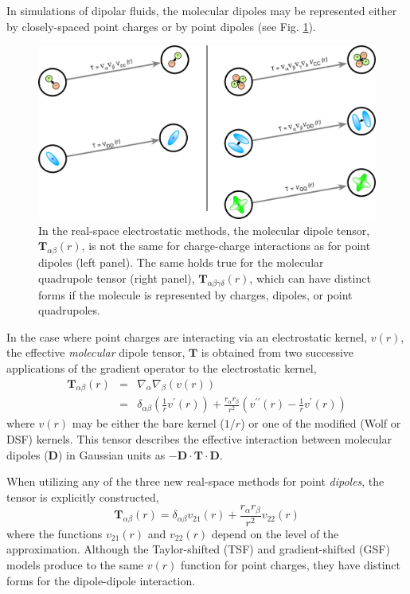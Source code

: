 In simulations of dipolar fluids, the molecular dipoles may be
represented either by closely-spaced point charges or by 
point dipoles (see Fig. \ref{fig:tensor}).
\begin{figure}
\includegraphics[width=\linewidth]{Tensors}
\caption{In the real-space electrostatic methods, the molecular dipole
  tensor, $\mathbf{T}_{\alpha\beta}(r)$, is not the same for
  charge-charge interactions as for point dipoles (left panel). The
  same holds true for the molecular quadrupole tensor (right panel),
  $\mathbf{T}_{\alpha\beta\gamma\delta}(r)$, which can have distinct
  forms if the molecule is represented by charges, dipoles, or point
  quadrupoles.}
\label{fig:tensor}
\end{figure}
In the case where point charges are interacting via an electrostatic
kernel, $v(r)$, the effective {\it molecular} dipole tensor,
$\mathbf{T}$ is obtained from two successive applications of the
gradient operator to the electrostatic kernel,
\begin{eqnarray}
\mathbf{T}_{\alpha \beta}(r) &=&  \nabla_\alpha \nabla_\beta
                               \left(v(r)\right)  \\
  &=& \delta_{\alpha \beta}
\left(\frac{1}{r} v^\prime(r) \right) + \frac{r_{\alpha}
  r_{\beta}}{r^2} \left( v^{\prime \prime}(r) - \frac{1}{r}
  v^{\prime}(r) \right)
\label{dipole-chargeTensor}
\end{eqnarray}
where $v(r)$ may be either the bare kernel ($1/r$) or one of the
modified (Wolf or DSF) kernels.  This tensor describes the effective
interaction between molecular dipoles ($\mathbf{D}$) in Gaussian units
as $-\mathbf{D} \cdot \mathbf{T} \cdot \mathbf{D}$.

When utilizing any of the three new real-space methods for point
\textit{dipoles}, the tensor is explicitly constructed,
\begin{equation}
\mathbf{T}_{\alpha \beta}(r)  =  \delta_{\alpha \beta} v_{21}(r) +
\frac{r_{\alpha} r_{\beta}}{r^2} v_{22}(r) 
\label{dipole-diopleTensor}
\end{equation}
where the functions $v_{21}(r)$ and $v_{22}(r)$ depend on the level of
the approximation.\cite{PaperI,PaperII} Although the Taylor-shifted
(TSF) and gradient-shifted (GSF) models produce to the same $v(r)$
function for point charges, they have distinct forms for the
dipole-dipole interaction.
 
